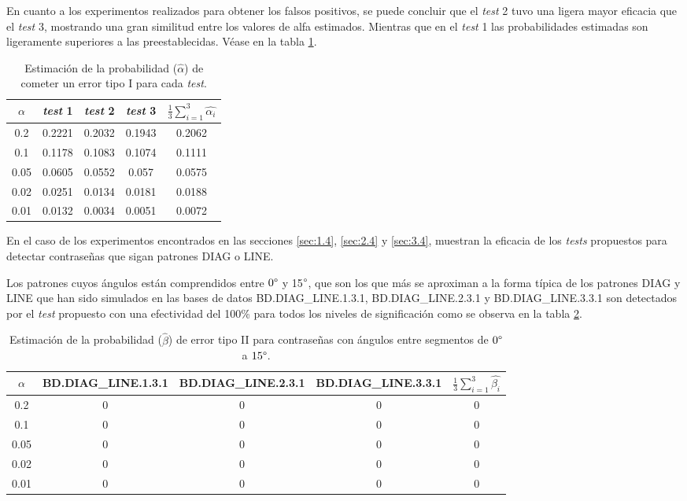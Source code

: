 \documentclass[12pt]{report}
\begin{document}
En cuanto a los experimentos realizados para obtener los falsos positivos, se puede concluir que el \textit{test} 2 tuvo una ligera mayor eficacia que el \textit{test} 3, mostrando una gran similitud entre los valores de alfa estimados. Mientras que en el \textit{test} 1 las probabilidades estimadas son ligeramente superiores a las preestablecidas. Véase en la tabla \ref{tab:error1}.
\begin{table}[h!]
	\centering
	\begin{tabular}{|c|ccc|c|}
		\hline
		$\alpha$& \textit{test} 1 & \textit{test} 2 & \textit{test} 3  & $\frac{1}{3} \sum_{i=1}^{3} \hat{\alpha_i}$  \\
		\hline
		0.2 &  0.2221    & 0.2032    &  0.1943 & 0.2062  \\
		0.1 &  0.1178    & 0.1083    &  0.1074 & 0.1111  \\
		0.05&  0.0605    & 0.0552    &  0.057  & 0.0575  \\
		0.02&  0.0251    & 0.0134    &  0.0181 & 0.0188  \\
		0.01&  0.0132    & 0.0034    &  0.0051 & 0.0072  \\
		\hline
	\end{tabular}
	\caption{Estimación de la probabilidad ($\hat{\alpha}$) de cometer un error tipo I para cada \textit{test}.}
	\label{tab:error1}
\end{table}

En el caso de los experimentos encontrados en las secciones \ref{sec:1.4}, \ref{sec:2.4} y \ref{sec:3.4}, muestran la eficacia de los \textit{tests} propuestos  para detectar contraseñas que sigan patrones DIAG o LINE.

Los patrones cuyos ángulos están comprendidos entre $0\degree$ y 15$\degree$, que son los que más se aproximan a la forma típica de los patrones DIAG y LINE que han sido simulados en las bases de datos BD.DIAG\_LINE.1.3.1, BD.DIAG\_LINE.2.3.1 y BD.DIAG\_LINE.3.3.1 son detectados por el \textit{test} propuesto con una efectividad del 100\% para todos los niveles de significación como se observa en la tabla \ref{tab:error2-0-15}.

\begin{table}[h!]
	\centering
	\begin{tabular}{|c|ccc|c|}
		\hline
		$\alpha$& BD.DIAG\_LINE.1.3.1 & BD.DIAG\_LINE.2.3.1 & BD.DIAG\_LINE.3.3.1  & $\frac{1}{3} \sum_{i=1}^{3} \hat{\beta_i}$ \\
		\hline
		0.2 & 0    & 0      & 0   &0 \\
		0.1 & 0    & 0      & 0   & 0\\
		0.05& 0    & 0  	& 0   & 0\\
		0.02& 0    & 0      & 0   & 0\\
		0.01& 0    & 0     & 0    & 0\\
		\hline
	\end{tabular}
	\caption{Estimación de la probabilidad ($\hat{\beta}$) de error tipo II para contraseñas con ángulos entre segmentos de $0\degree$ a $15\degree$.}
	\label{tab:error2-0-15}
\end{table}
\end{document}
